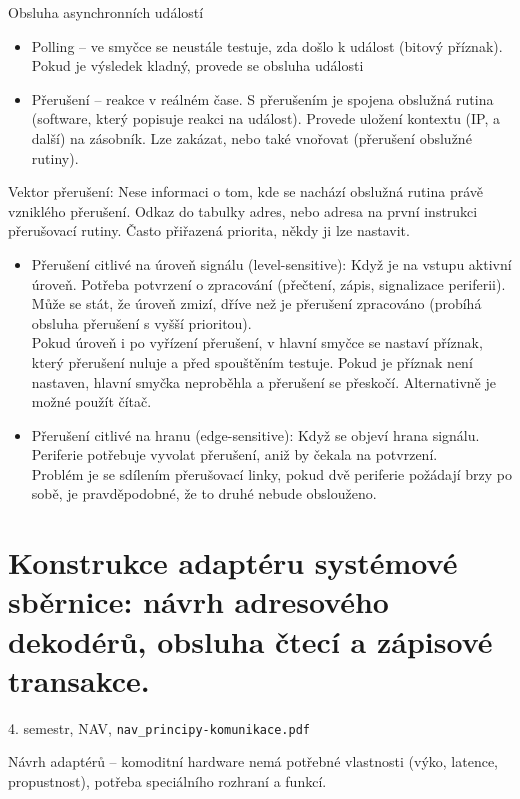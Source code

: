 \documentclass[a4paper, 11pt]{report}
\begin{document}
Obsluha asynchronních událostí
\begin{itemize}
	\item Polling -- ve smyčce se neustále testuje, zda došlo k událost (bitový příznak). Pokud je výsledek kladný, provede se obsluha události
	\item Přerušení -- reakce v reálném čase. S přerušením je spojena obslužná rutina (software, který popisuje reakci na událost). Provede uložení kontextu (IP, a další) na zásobník. Lze zakázat, nebo také vnořovat (přerušení obslužné rutiny).
\end{itemize}

Vektor přerušení: Nese informaci o tom, kde se nachází obslužná rutina právě vzniklého přerušení. Odkaz do tabulky adres, nebo adresa na první instrukci přerušovací rutiny. Často přiřazená priorita, někdy ji lze nastavit.

\begin{itemize}
	\item Přerušení citlivé na úroveň signálu (level-sensitive): Když je na vstupu aktivní úroveň. Potřeba potvrzení o zpracování (přečtení, zápis, signalizace periferii). Může se stát, že úroveň zmizí, dříve než je přerušení zpracováno (probíhá obsluha přerušení s vyšší prioritou).\\
	Pokud úroveň  i po vyřízení přerušení, v hlavní smyčce se nastaví příznak, který přerušení nuluje a před spouštěním testuje. Pokud je příznak není nastaven, hlavní smyčka neproběhla a přerušení se přeskočí. Alternativně je možné použít čítač.
	\item Přerušení citlivé na hranu (edge-sensitive): Když se objeví hrana signálu. Periferie potřebuje vyvolat přerušení, aniž by čekala na potvrzení.\\
	Problém je se sdílením přerušovací linky, pokud dvě periferie požádají brzy po sobě, je pravděpodobné, že to druhé nebude obslouženo.
\end{itemize}

\chapter{Konstrukce adaptéru systémové sběrnice: návrh adresového dekodérů, obsluha čtecí a zápisové transakce.} \label{cha:62}
4. semestr, NAV, \texttt{nav\_principy-komunikace.pdf}

Návrh adaptérů -- komoditní hardware nemá potřebné vlastnosti (výko, latence, propustnost), potřeba speciálního rozhraní a funkcí.
\end{document}
